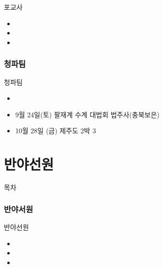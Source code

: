 \documentclass[aspectratio=1610,17pt,xcolor=pdftex,dvipsnames,table,handout]{beamer}
\begin{document}
		\begin{frame} [t,plain]
			\begin{block} {포교사}
			\begin{itemize}
				\item 
				\item 
				\item 
			\end{itemize}
			\end{block}
		\end{frame}

		\section{청파팀}

		\begin{frame} [t,plain]
			\begin{block} {청파팀}
			\begin{itemize}
				\item 
				\item 9월 24일(토) 팔재계 수계 대법회  법주사(충북보은)
				\item 10월 28일 (금)  제주도 2박 3
			\end{itemize}
			\end{block}
		\end{frame}


		\part{반야선원}
		\frame{\partpage}


		\begin{frame} [plain]{목차}
		\tableofcontents
		\end{frame}
		

		\section{반야서원}

		\begin{frame} [t,plain]
			\begin{block} {반야선원}
			\begin{itemize}
				\item 
				\item 
				\item 
			\end{itemize}
			\end{block}
		\end{frame}
\end{document}
